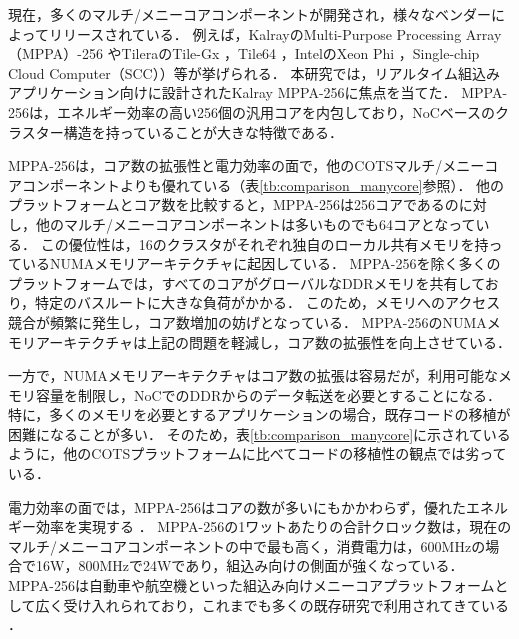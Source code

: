 \documentclass[submit,techrep]{ipsj_v2/UTF8/ipsj}
\begin{document}
現在，多くのマルチ/メニーコアコンポーネントが開発され，様々なベンダーによってリリースされている．
例えば，KalrayのMulti-Purpose Processing Array（MPPA）-256 \cite{de2014time}やTileraのTile-Gx \cite{ramey2011tile} \cite{schooler2010tile}，Tile64 \cite{bell2008tile64}，IntelのXeon Phi \cite{chrysos2014intel} \cite{chrysos2012intel}，Single-chip Cloud Computer（SCC）\cite{baron2010single}）等が挙げられる．
本研究では，リアルタイム組込みアプリケーション向けに設計されたKalray MPPA-256に焦点を当てた．
MPPA-256は，エネルギー効率の高い256個の汎用コアを内包しており，NoCベースのクラスター構造を持っていることが大きな特徴である．

MPPA-256は，コア数の拡張性と電力効率の面で，他のCOTSマルチ/メニーコアコンポーネントよりも優れている（表\ref{tb:comparison_manycore}参照）．
他のプラットフォームとコア数を比較すると，MPPA-256は256コアであるのに対し，他のマルチ/メニーコアコンポーネントは多いものでも64コアとなっている．
この優位性は，16のクラスタがそれぞれ独自のローカル共有メモリを持っているNUMAメモリアーキテクチャに起因している．
MPPA-256を除く多くのプラットフォームでは，すべてのコアがグローバルなDDRメモリを共有しており，特定のバスルートに大きな負荷がかかる．
このため，メモリへのアクセス競合が頻繁に発生し，コア数増加の妨げとなっている．
MPPA-256のNUMAメモリアーキテクチャは上記の問題を軽減し，コア数の拡張性を向上させている．

一方で，NUMAメモリアーキテクチャはコア数の拡張は容易だが，利用可能なメモリ容量を制限し，NoCでのDDRからのデータ転送を必要とすることになる．
特に，多くのメモリを必要とするアプリケーションの場合，既存コードの移植が困難になることが多い．
そのため，表\ref{tb:comparison_manycore}に示されているように，他のCOTSプラットフォームに比べてコードの移植性の観点では劣っている．

電力効率の面では，MPPA-256はコアの数が多いにもかかわらず，優れたエネルギー効率を実現する \cite{kanter2015kalray}．
MPPA-256の1ワットあたりの合計クロック数は，現在のマルチ/メニーコアコンポーネントの中で最も高く，消費電力は，600MHzの場合で16W，800MHzで24Wであり，組込み向けの側面が強くなっている．
MPPA-256は自動車や航空機といった組込み向けメニーコアプラットフォームとして広く受け入れられており，これまでも多くの既存研究で利用されてきている \cite{carle2014static} \cite{perret2016mapping} \cite{perret2016predictable}．
\end{document}
